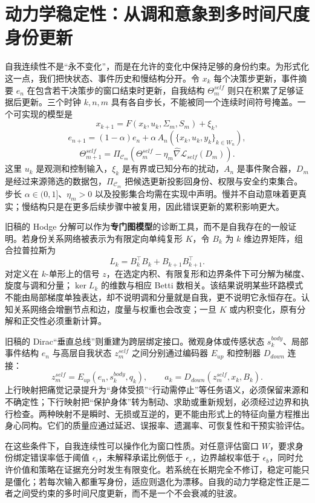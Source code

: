 \section{动力学稳定性：从调和意象到多时间尺度身份更新}
\label{sec:section_5884}

自我连续性不是“永不变化”，而是在允许的变化中保持足够的身份约束。为形式化这一点，我们把快状态、事件历史和慢结构分开。令 $x_k$ 每个决策步更新，事件摘要 $e_n$ 在包含若干决策步的窗口结束时更新，自我结构 $\Theta_m^{self}$ 则只在积累了足够证据后更新。三个时钟 $k,n,m$ 具有各自步长，不能被同一个连续时间符号掩盖。一个可实现的模型是
\[
x_{k+1}=F(x_k,u_k,\Sigma_m,S_m)+\xi_k,
\]
\[
e_{n+1}=(1-\alpha)e_n+\alpha\,A_n(\{x_k,u_k,y_k\}_{k\in W_n}),
\]
\[
\Theta_{m+1}^{self}=\Pi_{\mathcal{C}_m}\!\left(\Theta_m^{self}-\eta_m\widehat\nabla \mathcal{L}_{self}(D_m)\right).
\]
这里 $u_k$ 是观测和控制输入，$\xi_k$ 是有界或已知分布的扰动，$A_n$ 是事件聚合器，$D_m$ 是经过来源筛选的数据包，$\Pi_{\mathcal{C}_m}$ 把候选更新投影回身份、权限与安全约束集合。步长 $\alpha\in(0,1]$、$\eta_m>0$ 以及投影集合均需在实现中声明。慢并不自动意味着更真实；慢结构只是在更多后续步骤中被复用，因此错误更新的累积影响更大。

旧稿的 Hodge 分解可以作为\textbf{专门图模型}的诊断工具，而不是自我存在的一般证明。若身份关系网络被表示为有限定向单纯复形 $K$，令 $B_k$ 为 $k$ 维边界矩阵，组合拉普拉斯为
\[
L_k=B_k^{\top}B_k+B_{k+1}B_{k+1}^{\top}.
\]
对定义在 $k$-单形上的信号 $z$，在选定内积、有限复形和边界条件下可分解为梯度、旋度与调和分量；$\ker L_k$ 的维数与相应 Betti 数相关。该结果说明某些环路模式不能由局部梯度单独表达，却不说明调和分量就是自我，更不说明它永恒存在。认知关系网络会增删节点和边，度量与权重也会改变；一旦 $K$ 或内积变化，原有分解和正交性必须重新计算。

旧稿的 Dirac“垂直总线”则重建为跨层绑定接口。微观身体或传感状态 $s_k^{body}$、局部事件结构 $e_n$ 与高层自我状态 $z_m^{self}$ 之间分别通过编码器 $E_{up}$ 和控制器 $D_{down}$ 连接：
\[
z_m^{self}=E_{up}(e_n,s_k^{body},q_k),\qquad
a_k=D_{down}(z_m^{self},x_k,B_k).
\]
上行映射把痛觉记录提升为“身体受损”“行动需停止”等任务语义，必须保留来源和不确定性；下行映射把“保护身体”转为制动、求助或重新规划，必须经过边界和执行检查。两种映射不是瞬时、无损或互逆的，更不能由形式上的特征向量方程推出身心同构。它们的质量应通过延迟、误报率、遗漏率、可恢复性和干预实验评估。

在这些条件下，自我连续性可以操作化为窗口性质。对任意评估窗口 $W$，要求身份绑定错误率低于阈值 $\epsilon_i$，未解释承诺比例低于 $\epsilon_c$，边界越权率低于 $\epsilon_b$，同时允许价值和策略在证据充分时发生有限变化。若系统在长期完全不修订，稳定可能只是僵化；若每次输入都重写身份，适应则退化为漂移。自我的动力学稳定性正是二者之间受约束的多时间尺度更新，而不是一个不会衰减的驻波。

